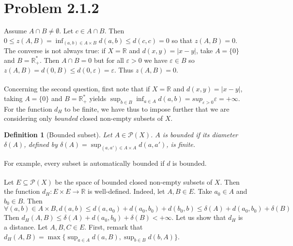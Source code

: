 \documentclass[11pt,a4paper]{article}
\newtheorem{defi}[theo]{Definition}
\newcommand{\il}{\textit}
\newcommand{\R}{\mathbb{R}}
\newcommand{\1}{\mathbbm{1}}
\renewcommand{\P}{\mathcal{P}}
\begin{document}
\section*{Problem 2.1.2}

Assume $A \cap B \neq \emptyset$. Let $c \in A \cap B$. Then $0 \leq z(A,B) = \inf_{(a,b) \in A \times B} d(a,b) \leq d(c,c) = 0$ so that $z(A,B) = 0$. The converse is not always true: if $X = \R$ and $d(x,y) = |x-y|$, take $A = \{0\}$ and $B = \R_+^*$. Then $A \cap B = 0$ but for all $\varepsilon > 0$ we have $\varepsilon \in B$ so $z(A,B) = d(0,B) \leq d(0,\varepsilon) = \varepsilon$. Thus $z(A,B) = 0$.\\\\
Concerning the second question, first note that if $X = \R$ and $d(x,y) = |x-y|$, taking $A = \{0\}$ and $B = \R_+^*$ yields $\sup_{b \in B} \inf_{a\in A} d(a,b) = sup_{\varepsilon > 0} \varepsilon = +\infty$. For the function $d_H$ to be finite, we have thus to impose further that we are considering only \il{bounded} closed non-empty subsets of $X$. 
\begin{defi}[Bounded subset] Let $A \in \P(X)$. $A$ is bounded if its diameter $\delta(A)$, defined by $\delta(A) = \sup_{(a,a') \in A \times A} d(a,a')$, is finite.
\end{defi}
For example, every subset is automatically bounded if $d$ is bounded.\\\\
Let $E \subseteq \P(X)$ be the space of bounded closed non-empty subsets of $X$. Then the function $d_H : E \times E \to \R$ is well-defined. Indeed, let $A,B \in E$. Take $a_0 \in A$ and $b_0 \in B$. Then
\[ \forall (a,b) \in A \times B,  d(a,b) \leq d(a,a_0) +  d(a_0,b_0) + d(b_0,b) \leq \delta(A) + d(a_0,b_0) + \delta(B) \]
Then $d_H(A,B) \leq \delta(A) + d(a_0,b_0) + \delta(B) < +\infty$. Let us show that $d_H$ is a distance.
Let $A,B,C \in E$. First, remark that $d_H(A,B) = \max\{ \sup_{a \in A} d(a,B) , \sup_{b \in B} d(b,A) \}$.
\end{document}
